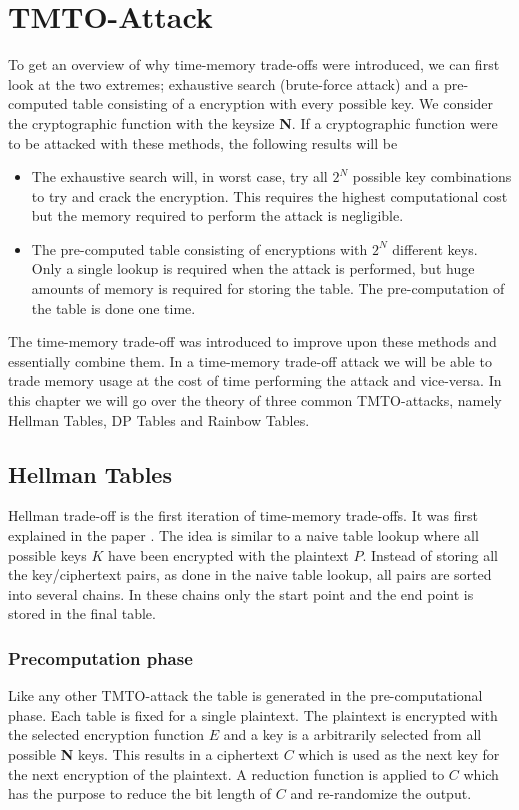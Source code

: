 \chapter{TMTO-Attack}
\label{ch:tmto}
To get an overview of why time-memory trade-offs were introduced, we
can first look at the two extremes; exhaustive search (brute-force
attack) and a pre-computed table consisting of a encryption with every
possible key. We consider the cryptographic function with the keysize
\textbf{N}. If a cryptographic function were to be attacked with these
methods, the following results will be
\begin{itemize}
\item The exhaustive search will, in worst case, try all $2^{N}$
  possible key combinations to try and crack the encryption. This
  requires the highest computational cost but the memory required to
  perform the attack is negligible.
\item The pre-computed table consisting of encryptions with $2^{N}$
  different keys. Only a single lookup is required when the attack is
  performed, but huge amounts of memory is required for storing the
  table. The pre-computation of the table is done one time.
\end{itemize}
The time-memory trade-off was introduced to improve upon these
methods and essentially combine them. In a time-memory trade-off
attack we will be able to trade memory usage at the cost of time
performing the attack and vice-versa. In this chapter we will go over
the theory of three common TMTO-attacks, namely Hellman Tables, DP
Tables and Rainbow Tables.
\section{Hellman Tables}
\label{sec:hmtheory}
Hellman trade-off is the first iteration of time-memory trade-offs. It
was first explained in the paper \cite{hells}.
The idea is similar to a naive table lookup where all possible keys $K$ have been encrypted with the plaintext $P$.
Instead of storing all the key/ciphertext pairs, as done in the naive
table lookup, all pairs are sorted into several chains. In these
chains only the start point and the end point is stored in the final table.

\subsection{Precomputation phase} %
Like any other TMTO-attack the table is generated in the
pre-computational phase. Each table is fixed for a single
plaintext. The plaintext is encrypted with the selected encryption
function $E$ and a key is a arbitrarily selected from all possible \textbf{N}
keys. This results in a ciphertext $C$ which is used as the
next key for the next encryption of the plaintext. A reduction
function is applied to $C$ which has the purpose to reduce the bit
length of $C$ and re-randomize the output.


